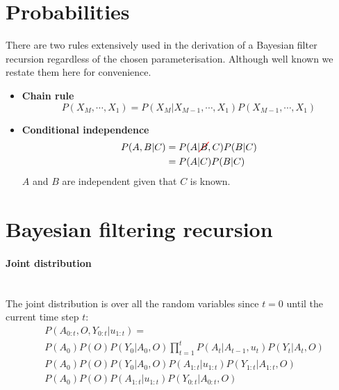 \begin{appendices}
\section{Probabilities}

There are two rules extensively used in the derivation of a Bayesian filter recursion regardless 
of the chosen parameterisation. Although well known we restate them here for convenience.

\begin{itemize}
 \item \textbf{Chain rule}\\
 \begin{equation}
  P(X_M,\cdots,X_1) = P(X_M|X_{M-1},\cdots,X_1) P(X_{M-1},\cdots,X_1) \label{eq:ch5:chain_rule}
 \end{equation}
 \item \textbf{Conditional independence}\\
  \begin{align}
    P(A,B|C) &= P(A|\Ccancel[red]{B},C) P(B|C) \nonumber \\
             &= P(A|C) P(B|C)
  \end{align}
  $A$ and $B$ are independent given that $C$ is known.
\end{itemize}


\section{Bayesian filtering recursion}\label{appendix:bayes_recursion}

\paragraph{Joint distribution}\\

The joint distribution is over all the random variables since $t=0$ until the current 
time step $t$:
\begin{align}
 &P(A_{0:t},O,Y_{0:t}|u_{1:t}) =\nonumber \\ 
 &P(A_0)P(O)P(Y_0|A_0,O)\prod_{t=1}^t P(A_t|A_{t-1},u_{t}) P(Y_t|A_t,O) \label{eq:ch5:app:joint} \\
 &P(A_0)P(O)P(Y_0|A_0,O) P(A_{1:t}|u_{1:t}) P(Y_{1:t}|A_{1:t},O)  \label{eq:ch5:app:joint_2} \\
 &P(A_0)P(O) P(A_{1:t}|u_{1:t}) P(Y_{0:t}|A_{0:t},O) \label{eq:ch5:joint_final}
\end{align}


\end{appendices}
